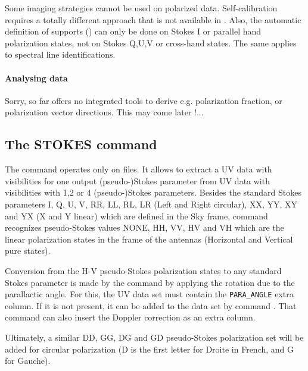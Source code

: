 Some imaging strategies cannot be used on polarized data. Self-calibration
requires a totally different approach that is not available in \imager{}.
Also, the automatic definition of supports () 
can only be done on Stokes I or parallel hand polarization states, not
on Stokes Q,U,V or cross-hand states. The same applies to spectral
line identifications.
 
\paragraph{Analysing data}
Sorry, so far \imager{} offers no integrated tools to derive e.g.
polarization fraction, or polarization vector directions. This may
come later !...
 
\subsection{The STOKES command}

The  command operates only on files. It allows
to extract a UV data with visibilities for one output (pseudo-)Stokes 
parameter from UV data with visibilities with 1,2 or 4 (pseudo-)Stokes
parameters. Besides the standard Stokes parameters I, Q, U, V, RR, 
LL, RL, LR (Left and Right circular), XX, YY, XY and YX (X and Y
linear) which are defined in the Sky frame,
command  recognizes pseudo-Stokes values NONE, HH, VV,
HV and VH which are the linear polarization states in the frame
of the antennas (Horizontal and Vertical pure states).

Conversion from the H-V pseudo-Stokes polarization states to any standard
Stokes parameter is made by the  command by applying 
the rotation due to the parallactic angle. For this, the UV data set
must contain the \texttt{PARA\_ANGLE} extra column. If it is not present,
it can be added to the data set by command .
That command can also insert the Doppler correction as an extra
column.

Ultimately, a similar DD, GG, DG and GD pseudo-Stokes polarization set
will be added for circular polarization (D is the first letter for
Droite in French, and G for Gauche). 
